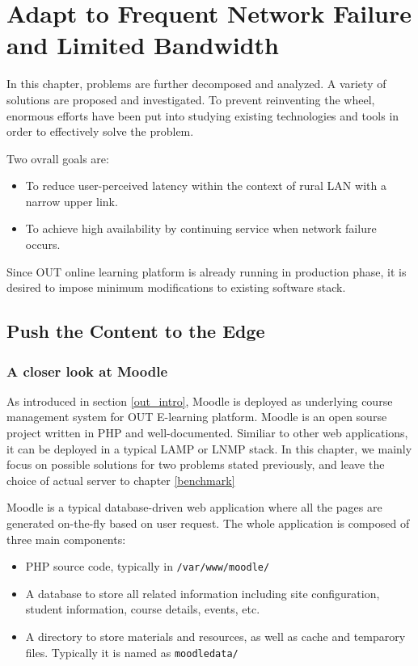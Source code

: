 \chapter{Adapt to Frequent Network Failure and Limited Bandwidth}
In this chapter, problems are further decomposed and analyzed. A variety of solutions are proposed and investigated. To prevent reinventing the wheel, enormous efforts have been put into studying existing technologies and tools in order to effectively solve the problem.

Two ovrall goals are:
\begin{itemize}
\item To reduce user-perceived latency within the context of rural LAN with a narrow upper link.
\item To achieve high availability by continuing service when network failure occurs.
\end{itemize}

Since OUT online learning platform is already running in production phase, it is desired to impose minimum modifications to existing software stack.

\section{Push the Content to the Edge}

\subsection{A closer look at Moodle}
As introduced in section \ref{out_intro}, Moodle is deployed as underlying course management system for OUT E-learning platform. Moodle is an open sourse project written in PHP and well-documented\cite{aosamoodle}\cite{moodledoc}. Similiar to other web applications, it can be deployed in a typical LAMP or LNMP stack. In this chapter, we mainly focus on possible solutions for two problems stated previously, and leave the choice of actual server to chapter \ref{benchmark}

Moodle is a typical database-driven web application where all the pages are generated on-the-fly based on user request. The whole application is composed of three main components: 
\begin{itemize}
\item PHP source code, typically in \texttt{/var/www/moodle/}
\item A database to store all related information including site configuration, student information, course details, events, etc.
\item A directory to store materials and resources, as well as cache and temparory files. Typically it is named as \texttt{moodledata/}
\end{itemize}

